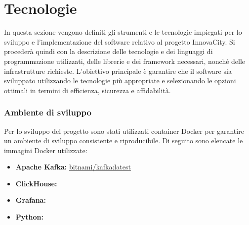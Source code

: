 \section{Tecnologie}
In questa sezione vengono definiti gli strumenti e le tecnologie impiegati per lo sviluppo e l'implementazione del software relativo al progetto InnovaCity. Si procederà quindi con la descrizione delle tecnologie e dei linguaggi di programmazione utilizzati, delle librerie e dei framework necessari, nonché delle infrastrutture richieste. L'obiettivo principale è garantire che il software sia sviluppato utilizzando le tecnologie più appropriate e selezionando le opzioni ottimali in termini di efficienza, sicurezza e affidabilità.

\subsubsection{Ambiente di sviluppo}
Per lo sviluppo del progetto sono stati utilizzati container Docker per garantire un ambiente di sviluppo consistente e riproducibile. Di seguito sono elencate le immagini Docker utilizzate:

\begin{itemize}
  \item \textbf{Apache Kafka:} \href{https://hub.docker.com/layers/bitnami/kafka/latest/images/sha256-4894d89d28f8e06a7d8a064efdc2dc9cb61dd205721c61296b6d033ad4824a91?context=explore}{bitnami/kafka:latest}
  \item \textbf{ClickHouse:} 
  \item \textbf{Grafana:} 
  \item \textbf{Python:} 
\end{itemize}








